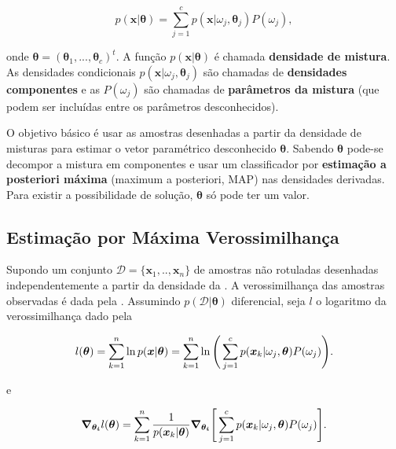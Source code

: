 \begin{equation}
    p(\boldsymbol{x}|\boldsymbol{\theta}) = \sum_{j=1}^c p(\boldsymbol{x}|\omega_j, \boldsymbol{\theta}_j) P(\omega_j),
    \label{eq:pdf_mixtures}
\end{equation}

\noindent onde $\boldsymbol{\theta} = (\boldsymbol{\theta}_1, ..., \boldsymbol{\theta}_c)^t$. A função $p(\boldsymbol{x}|\boldsymbol{\theta})$ é chamada \textbf{densidade de mistura}. As densidades condicionais $p(\boldsymbol{x}|\omega_j, \boldsymbol{\theta}_j)$ são chamadas de \textbf{densidades componentes} e as $P(\omega_j)$ são chamadas de \textbf{parâmetros da mistura} (que podem ser incluídas entre os parâmetros desconhecidos).

O objetivo básico é usar as amostras desenhadas a partir da densidade de misturas para estimar o vetor paramétrico desconhecido $\boldsymbol{\theta}$. Sabendo $\boldsymbol{\theta}$ pode-se decompor a mistura em componentes e usar um classificador por \textbf{estimação a posteriori máxima} (maximum a posteriori, MAP) nas densidades derivadas. Para existir a possibilidade de solução, $\boldsymbol{\theta}$ só pode ter um valor.

\subsection{Estimação por Máxima Verossimilhança}

Supondo um conjunto $\mathcal{D} = \{\boldsymbol{x}_1, .., \boldsymbol{x}_n\}$ de amostras não rotuladas desenhadas independentemente a partir da densidade da . A verossimilhança das amostras observadas é dada pela . Assumindo $p(\mathcal{D}|\boldsymbol{\theta})$ diferencial, seja $l$ o logaritmo da verossimilhança dado pela 

\begin{equation}
    l(\boldsymbol{\theta}) = \sum_{k=1}^n \ln p(\boldsymbol{x}|\boldsymbol{\theta}) = \sum_{k=1}^n \ln \Bigg{(}\sum_{j=1}^c p(\boldsymbol{x}_k|\omega_j,\boldsymbol{\theta})P(\omega_j)\Bigg{)}.
    \label{eq:log_mixtures}
\end{equation}

\noindent e

\begin{equation}
    \boldsymbol{\nabla_{\theta_i}} l(\boldsymbol{\theta}) = \sum_{k=1}^n \frac{1}{p(\boldsymbol{x}_k|\boldsymbol{\theta})} \boldsymbol{{\nabla_{\theta_i}}} \Bigg{[}\sum_{j=1}^c p(\boldsymbol{x}_k|\omega_j,\boldsymbol{\theta})P(\omega_j)\Bigg{]}.
    \label{eq:gradient_theta_log_mixtures_1}
\end{equation}

